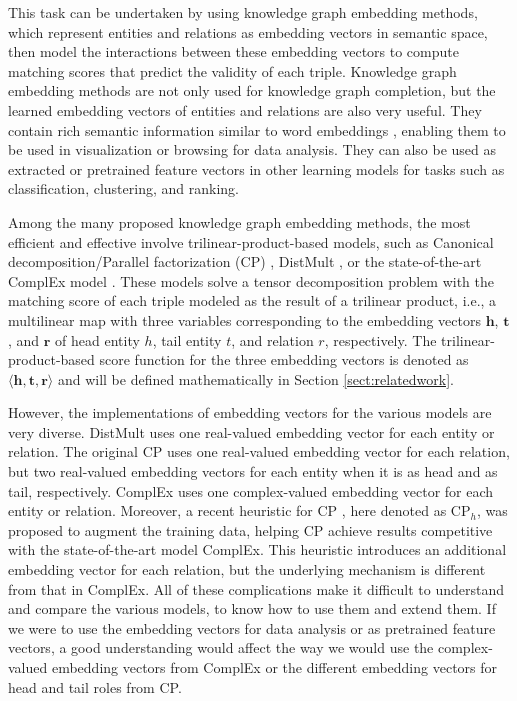 \documentclass[sigconf,edbt]{acmart-edbt2019}
\def\vh{{\bm{h}}}
\def\vr{{\bm{r}}}
\def\vt{{\bm{t}}}
\begin{document}
This task can be undertaken by using knowledge graph embedding methods, which represent entities and relations as embedding vectors in semantic space, then model the interactions between these embedding vectors to compute matching scores that predict the validity of each triple. Knowledge graph embedding methods are not only used for knowledge graph completion, but the learned embedding vectors of entities and relations are also very useful. They contain rich semantic information similar to word embeddings \cite{mikolov_distributedrepresentationswords_2013} \cite{mikolov_efficientestimationword_2013} \cite{jeffreypennington_gloveglobalvectors_2014}, enabling them to be used in visualization or browsing for data analysis. They can also be used as extracted or pretrained feature vectors in other learning models for tasks such as classification, clustering, and ranking.

Among the many proposed knowledge graph embedding methods, the most efficient and effective involve trilinear-product-based models, such as Canonical decomposition/Parallel factorization (CP) \cite{hitchcock_expressiontensorpolyadic_1927} \cite{lacroix_canonicaltensordecomposition_2018}, DistMult \cite{yang_embeddingentitiesrelations_2015}, or the state-of-the-art ComplEx model \cite{trouillon_complexembeddingssimple_2016}. These models solve a tensor decomposition problem with the matching score of each triple modeled as the result of a trilinear product, i.e., a multilinear map with three variables corresponding to the embedding vectors $ \vh $, $ \vt $, and $ \vr $ of head entity $ h $, tail entity $ t $, and relation $ r $, respectively. The trilinear-product-based score function for the three embedding vectors is denoted as $ \langle \vh, \vt, \vr \rangle $ and will be defined mathematically in Section \ref{sect:relatedwork}.
 
However, the implementations of embedding vectors for the various models are very diverse. DistMult \cite{yang_embeddingentitiesrelations_2015} uses one real-valued embedding vector for each entity or relation. The original CP \cite{hitchcock_expressiontensorpolyadic_1927} uses one real-valued embedding vector for each relation, but two real-valued embedding vectors for each entity when it is as head and as tail, respectively. ComplEx \cite{trouillon_complexembeddingssimple_2016} uses one complex-valued embedding vector for each entity or relation. Moreover, a recent heuristic for CP \cite{lacroix_canonicaltensordecomposition_2018}, here denoted as CP$ _h $, was proposed to augment the training data, helping CP achieve results competitive with the state-of-the-art model ComplEx. This heuristic introduces an additional embedding vector for each relation, but the underlying mechanism is different from that in ComplEx. All of these complications make it difficult to understand and compare the various models, to know how to use them and extend them. If we were to use the embedding vectors for data analysis or as pretrained feature vectors, a good understanding would affect the way we would use the complex-valued embedding vectors from ComplEx or the different embedding vectors for head and tail roles from CP.
\end{document}

